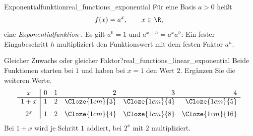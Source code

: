 \par\noindent\begin{minipage}{\linewidth}
\begin{DefinitionBox}{Exponentialfunktion}{real_functions_exponential}
  Für eine Basis $a>0$ heißt
  \[
    f(x)=a^x,\qquad x\in\R,
  \]
  eine \emph{Exponentialfunktion} .
  Es gilt $a^0=1$ und $a^{x+h}=a^x a^h$: Ein fester Eingabeschritt $h$
  multipliziert den Funktionswert mit dem festen Faktor $a^h$.
\end{DefinitionBox}
\begin{ExampleBox}[before skip=0.3\baselineskip]{Gleicher Zuwachs oder gleicher Faktor?}{real_functions_linear_exponential}
  Beide Funktionen starten bei $1$ und haben bei $x=1$ den Wert $2$.
  Ergänzen Sie die weiteren Werte.
  \[
    \begin{array}{c|rrrrr}
      x&0&1&2&3&4\\ \hline
      1+x&1&2&\Cloze{1cm}{3}&\Cloze{1cm}{4}&\Cloze{1cm}{5}\\[0.6em]
      2^x&1&2&\Cloze{1cm}{4}&\Cloze{1cm}{8}&\Cloze{1cm}{16}
    \end{array}
  \]
  Bei $1+x$ wird je Schritt $1$ addiert, bei $2^x$ mit $2$ multipliziert.
\end{ExampleBox}
\end{minipage}

\begin{center}
\end{center}

\clearpage
